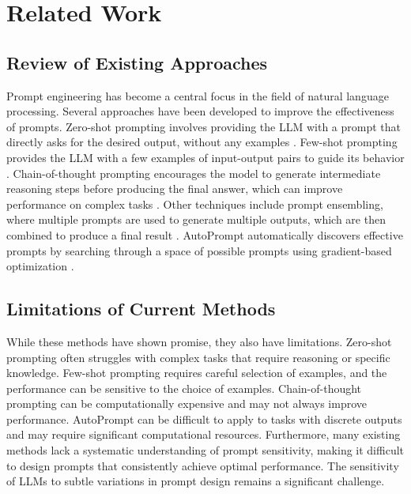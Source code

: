 \documentclass{article}
\begin{document}
\section{Related Work}
\label{sec:related_work}

\subsection{Review of Existing Approaches}
Prompt engineering has become a central focus in the field of natural language processing.  Several approaches have been developed to improve the effectiveness of prompts. Zero-shot prompting involves providing the LLM with a prompt that directly asks for the desired output, without any examples \cite{brown2020language}. Few-shot prompting provides the LLM with a few examples of input-output pairs to guide its behavior \cite{brown2020language}. Chain-of-thought prompting encourages the model to generate intermediate reasoning steps before producing the final answer, which can improve performance on complex tasks \cite{wei2022chain}.  Other techniques include prompt ensembling, where multiple prompts are used to generate multiple outputs, which are then combined to produce a final result \cite{gao2020making}.  AutoPrompt automatically discovers effective prompts by searching through a space of possible prompts using gradient-based optimization \cite{shin2020autoprompt}.

\subsection{Limitations of Current Methods}
While these methods have shown promise, they also have limitations. Zero-shot prompting often struggles with complex tasks that require reasoning or specific knowledge. Few-shot prompting requires careful selection of examples, and the performance can be sensitive to the choice of examples. Chain-of-thought prompting can be computationally expensive and may not always improve performance. AutoPrompt can be difficult to apply to tasks with discrete outputs and may require significant computational resources. Furthermore, many existing methods lack a systematic understanding of prompt sensitivity, making it difficult to design prompts that consistently achieve optimal performance. The sensitivity of LLMs to subtle variations in prompt design remains a significant challenge.
\end{document}

